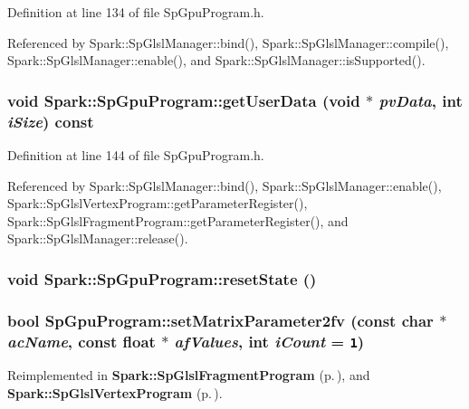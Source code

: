 Definition at line 134 of file Sp\-Gpu\-Program.h.

Referenced by Spark::Sp\-Glsl\-Manager::bind(), Spark::Sp\-Glsl\-Manager::compile(), Spark::Sp\-Glsl\-Manager::enable(), and Spark::Sp\-Glsl\-Manager::is\-Supported().
\subsubsection{\setlength{\rightskip}{0pt plus 5cm}void Spark::Sp\-Gpu\-Program::get\-User\-Data (void $\ast$ {\em pv\-Data}, int {\em i\-Size}) const\hspace{0.3cm}{\tt  [inline]}}\label{classSpark_1_1SpGpuProgram_a6}


Definition at line 144 of file Sp\-Gpu\-Program.h.

Referenced by Spark::Sp\-Glsl\-Manager::bind(), Spark::Sp\-Glsl\-Manager::enable(), Spark::Sp\-Glsl\-Vertex\-Program::get\-Parameter\-Register(), Spark::Sp\-Glsl\-Fragment\-Program::get\-Parameter\-Register(), and Spark::Sp\-Glsl\-Manager::release().
\subsubsection{\setlength{\rightskip}{0pt plus 5cm}void Spark::Sp\-Gpu\-Program::reset\-State ()}\label{classSpark_1_1SpGpuProgram_a8}


\subsubsection{\setlength{\rightskip}{0pt plus 5cm}bool Sp\-Gpu\-Program::set\-Matrix\-Parameter2fv (const char $\ast$ {\em ac\-Name}, const float $\ast$ {\em af\-Values}, int {\em i\-Count} = {\tt 1})\hspace{0.3cm}{\tt  [virtual]}}\label{classSpark_1_1SpGpuProgram_a28}




Reimplemented in {\bf Spark::Sp\-Glsl\-Fragment\-Program} {\rm (p.\,\pageref{classSpark_1_1SpGlslFragmentProgram_a17})}, and {\bf Spark::Sp\-Glsl\-Vertex\-Program} {\rm (p.\,\pageref{classSpark_1_1SpGlslVertexProgram_a17})}.

